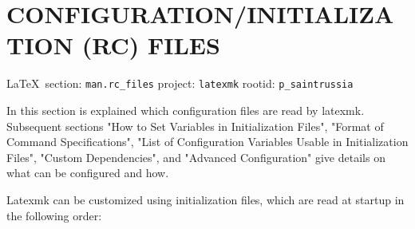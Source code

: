  
 
  
\section{CONFIGURATION/INITIALIZATION (RC) FILES}

\vspace{0.5cm}
 {\ifDEBUG\small\LaTeX~section: \verb|man.rc_files| project: \verb|latexmk| rootid: \verb|p_saintrussia| \fi}
\vspace{0.5cm}
  
In this section is explained which configuration files are read by latexmk.
Subsequent sections "How  to  Set  Variables  in  Initialization Files",
"Format  of  Command  Specifications",  "List of Configuration Variables Usable
in Initialization Files", "Custom  Dependencies",  and "Advanced Configuration"
give  details  on what can be configured and how.

Latexmk can be customized using initialization files, which are read at startup
in the following order:

